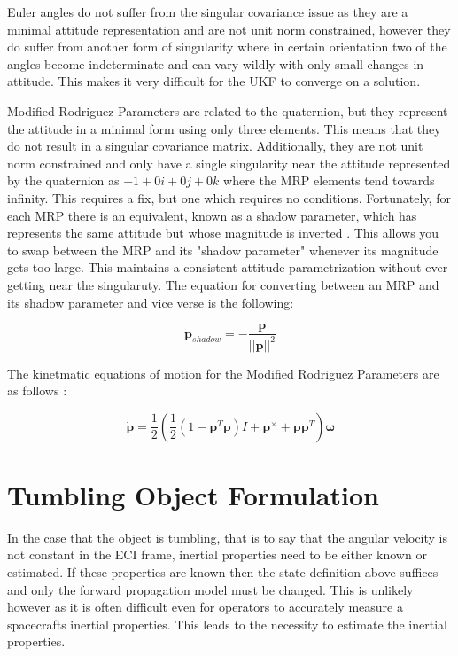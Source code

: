 Euler angles do not suffer from the singular covariance issue as they are a minimal attitude representation and are not unit norm constrained, however they do suffer from another form of singularity where in certain orientation two of the angles become indeterminate and can vary wildly with only small changes in attitude. This makes it very difficult for the UKF to converge on a solution.

Modified Rodriguez Parameters are related to the quaternion, but they represent the attitude in a minimal form using only three elements. This means that they do not result in a singular covariance matrix. Additionally, they are not unit norm constrained and only have a single singularity near the attitude represented by the quaternion as $-1 + 0i + 0j + 0k$ where the MRP elements tend towards infinity. This requires a fix, but one which requires no conditions. Fortunately, for each MRP there is an equivalent, known as a shadow parameter, which has represents the same attitude but whose magnitude is inverted \cite{MRPs}. This allows you to swap between the MRP and its "shadow parameter" whenever its magnitude gets too large. This maintains a consistent attitude parametrization without ever getting near the singularuty. The equation for converting between an MRP and its shadow parameter and vice verse is the following:

\begin{equation}
\bm{p}_{shadow} = -\frac{\bm{p}}{||\bm{p}||^2}
\end{equation}

The kinetmatic equations of motion for the Modified Rodriguez Parameters are as follows \cite{Crassidis_MRPs}:

\begin{equation}
	\dot{\bm{p}} = \frac{1}{2} \left ( \frac{1}{2} (1 - \bm{p}^T\bm{p})I + \bm{p}^{\times} + \bm{p}\bm{p}^T \right )\bm{\omega}
\end{equation}

\section{Tumbling Object Formulation}

In the case that the object is tumbling, that is to say that the angular velocity is not constant in the ECI frame, inertial properties need to be either known or estimated. If these properties are known then the state definition above suffices and only the forward propagation model must be changed. This is unlikely however as it is often difficult even for operators to accurately measure a spacecrafts inertial properties. This leads to the necessity to estimate the inertial properties.


